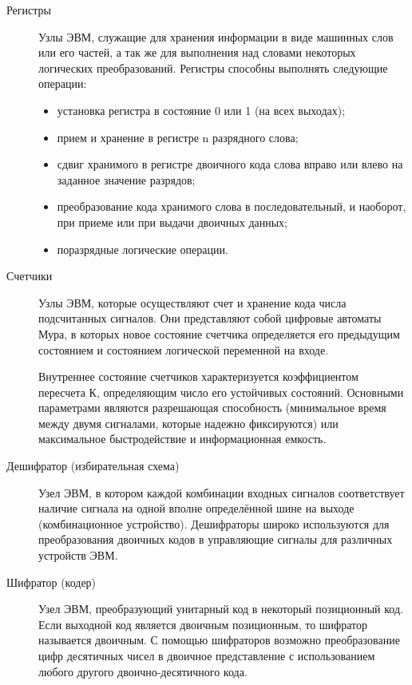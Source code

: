 \begin{description}
    \item [Регистры]
          Узлы ЭВМ, служащие для хранения информации в виде машинных слов или его частей, а так же для выполнения над словами некоторых логических преобразований.
          Регистры способны выполнять следующие операции:
          \begin{itemize}
              \item установка регистра в состояние 0 или 1 (на всех выходах);
              \item прием и хранение в регистре n разрядного слова;
              \item сдвиг хранимого в регистре двоичного кода слова вправо или влево на заданное значение разрядов;
              \item преобразование кода хранимого слова в последовательный, и наоборот, при приеме или при выдачи двоичных данных;
              \item поразрядные логические операции.
          \end{itemize}

    \item [Счетчики]
          Узлы ЭВМ, которые осуществляют счет и хранение кода числа подсчитанных сигналов.
          Они представляют собой цифровые автоматы Мура, в которых новое состояние счетчика определяется его предыдущим состоянием и состоянием логической переменной на входе.

          Внутреннее состояние счетчиков характеризуется коэффициентом пересчета К, определяющим число его устойчивых состояний. Основными параметрами являются разрешающая способность (минимальное время между двумя сигналами, которые надежно фиксируются) или максимальное быстродействие и информационная емкость.

    \item [Дешифратор (избирательная схема)]
          Узел ЭВМ, в котором каждой комбинации входных сигналов соответствует наличие сигнала на одной вполне определённой шине на выходе (комбинационное устройство). Дешифраторы широко используются для преобразования двоичных кодов в управляющие сигналы для различных устройств ЭВМ.

    \item [Шифратор (кодер)]
          Узел ЭВМ, преобразующий унитарный код в некоторый позиционный код. Если выходной код является двоичным позиционным, то шифратор называется двоичным. С помощью шифраторов возможно преобразование цифр десятичных чисел в двоичное представление с использованием любого другого двоично-десятичного кода.


\end{description}
